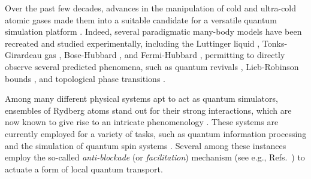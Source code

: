 \documentclass[prl,aps,twocolumn,showpacs,superscriptaddress,longbibliography]{revtex4-1}
\begin{document}
Over the past few decades, advances in the manipulation of cold and ultra-cold atomic gases made them into a suitable candidate for a versatile quantum simulation platform \cite{Bloch_2008,Bloch_2012}. Indeed, several paradigmatic many-body models have been recreated and studied experimentally, including the Luttinger liquid \cite{hofferberth2007}, Tonks-Girardeau gas \cite{kinoshita2004}, Bose-Hubbard \cite{greiner2002, greiner2003}, and Fermi-Hubbard \cite{Kohl2005}, permitting to directly observe several predicted phenomena, such as quantum revivals \cite{greiner2002_revival}, Lieb-Robinson bounds \cite{cheneau2012}, and topological phase transitions \cite{hadzibabic2006}.


Among many different physical systems apt to act as quantum simulators, ensembles of Rydberg atoms \cite{a_Saffman_RMP_10, Low_2012, Gallagher_1994} stand out for their strong interactions, which are now known to give rise to an intricate phenomenology \cite{Weimer2010, Lan2016, Levi2016, Lan2015, Schempp2014, Schauss_2015, Low2009, Sibalic2016, Carr2013, Marcuzzi2014, Gutierrez2015}. These systems are currently employed for a variety of tasks, such as quantum information processing \cite{Jaksch2000,Weimer_2010,Saffman_2016} and the simulation of quantum spin systems \cite{Labuhn_2015, Schauss_2015}. Several among these instances employ the so-called \emph{anti-blockade} (or \emph{facilitation}) mechanism (see e.g., Refs.~\cite{Ates_2007,Amthor_2010,Garttner_2013,schonleber2014,Lesanovsky_2014,Urvoy_2015,Valado_2016}) to actuate a form of local quantum transport. 

%
\end{document}
